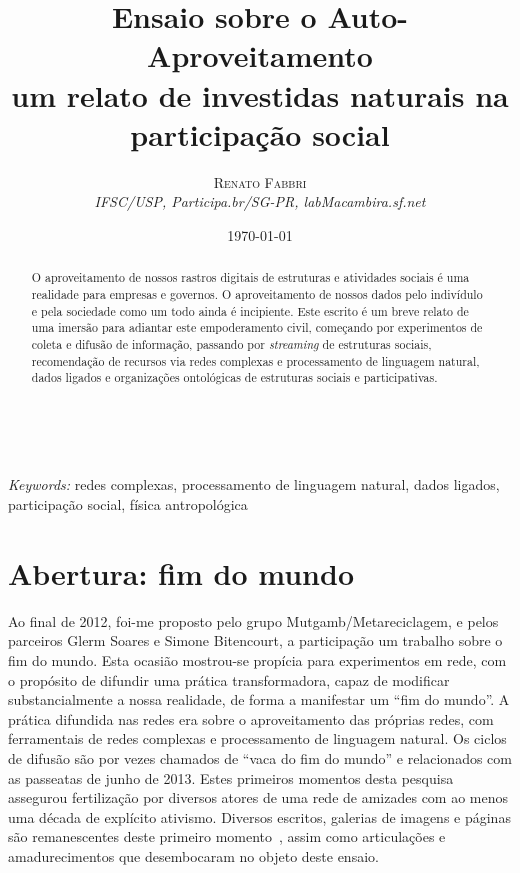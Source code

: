 \documentclass[a4paper, 11pt]{article} %
\title{\textbf{Ensaio sobre o Auto-Aproveitamento}\\ %
um relato de investidas naturais na participação social} %
\author{\textsc{Renato Fabbri} %
\\{\textit{IFSC/USP, Participa.br/SG-PR, labMacambira.sf.net}}} %
\date{\today} %
\makeatletter
\renewcommand{\maketitle}{ %
\begin{flushright} %
{\LARGE\@title} %

\vspace{50pt} %

{\large\@author} %
\\\@date %

\vspace{40pt} %
\end{flushright}
}
\makeatother
\begin{document}
\maketitle %



\begin{abstract}
O aproveitamento de nossos rastros digitais de estruturas e atividades sociais é uma realidade para empresas e governos. O aproveitamento de nossos dados pelo indivídulo e pela sociedade como um todo ainda é incipiente. Este escrito é um breve relato de uma imersão para adiantar este empoderamento civil, começando por experimentos de coleta e difusão de informação, passando por \emph{streaming} de estruturas sociais, recomendação de recursos via redes complexas e processamento de linguagem natural, dados ligados e organizações ontológicas de estruturas sociais e participativas.
\end{abstract}

\hspace*{3,6mm}\textit{Keywords:} redes complexas, processamento de linguagem natural, dados ligados, participação social, física antropológica %

\vspace{30pt} %


\section*{Abertura: fim do mundo}

Ao final de 2012, foi-me proposto pelo grupo Mutgamb/Metareciclagem, e pelos parceiros Glerm Soares e Simone Bitencourt, a participação  um trabalho sobre o fim do mundo. Esta ocasião mostrou-se propícia para experimentos em rede, com o propósito de difundir uma prática transformadora, capaz de modificar substancialmente a nossa realidade, de forma a manifestar um ``fim do mundo''. A prática difundida nas redes era sobre o aproveitamento das próprias redes, com ferramentais de redes complexas e processamento de linguagem natural. Os ciclos de difusão são por vezes chamados de ``vaca do fim do mundo'' e relacionados com as passeatas de junho de 2013. Estes primeiros momentos desta pesquisa assegurou fertilização por diversos atores de uma rede de amizades com ao menos uma década de explícito ativismo. Diversos escritos, galerias de imagens e páginas são remanescentes deste primeiro momento~\cite{ciberiun,ars,rc1,rc2}, assim como articulações e amadurecimentos que desembocaram no objeto deste ensaio.
\end{document}
